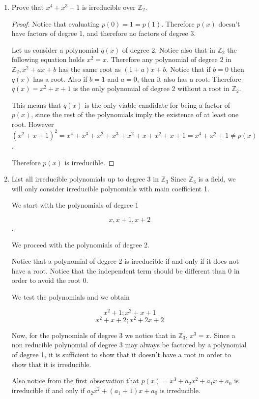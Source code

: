 \documentclass[12pt]{article}
\begin{document}
\begin{enumerate}
    \item Prove that $x^4 + x^3+1$ is irreducible over $\mathbb{Z}_2$.
    
    \begin{proof}
    Notice that evaluating $p(0) = 1 = p(1)$. Therefore $p(x)$ doesn't have factors of degree 1, and therefore no factors of degree 3. 
    
    Let us consider a polynomial $q(x)$ of degree 2. Notice also that in $\mathbb{Z}_2$ the following equation holds $x^2 = x$. Therefore any polynomial of degree 2 in $\mathbb{Z}_2, x^2 + a x + b$ has the same root as $(1+a) x + b$. Notice that if $b = 0$ then $q(x)$ has a root. Also if $b= 1$ and $a = 0$, then it also has a root. Therefore $q(x) = x^2 + x + 1$ is the only polynomial of degree 2 without a root in $\mathbb{Z}_2$.
    
    This means that $q(x)$ is the only viable candidate for being a factor of $p(x)$, since the rest of the polynomials imply the existence of at least one root. However $(x^2 +x +1)^2 = x^4 +x^3+ x^2+x^3+x^2+x+x^2+x+1 = x^4+x^2+1 \neq p(x)$.
    
    Therefore $p(x)$ is irreducible.
    \end{proof}
    
    \item List all irreducible polynomials up to degree 3 in $\mathbb{Z}_3$
    Since $\mathbb{Z}_3$ is a field, we will only consider irreducible polynomials with main coefficient 1.
    
    We start with the polynomials of degree 1
    
    $$ x, x+1, x+2 $$.
    
    We proceed with the polynomials of degree 2.
    
    Notice that a polynomial of degree 2 is irreducible if and only if it does not have a root. Notice that the independent term should be different than $0$ in order to avoid the root $0$.
    
    We test the polynomials and we obtain 
    
    $$ x^2 +1; x^2+x+1$$
    $$ x^2 +x+2; x^2+2x+2$$
    
    Now, for the polynomials of degree 3 we notice that in $\mathbb{Z}_3$, $x^3 = x$. Since a non reducible polynomial of degree 3 may always be factored by a polynomial of degree 1, it is sufficient to show that it doesn't have a root in order to show that it is irreducible.
    
    Also notice from the first observation that $p(x) = x^3 + a_2 x^2 + a_1 x + a_0$ is irreducible if and only if $a_2 x^2 + (a_1+1)x + a_0$ is irreducible.
    

\end{enumerate}
\end{document}
